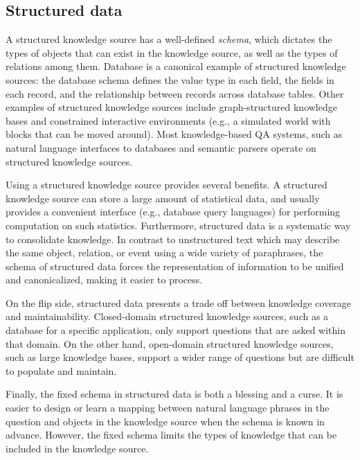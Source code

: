 \subsection{Structured data}

A structured knowledge source
has a well-defined \emph{schema}, which dictates
the types of objects that can exist in the knowledge source,
as well as the types of relations among them.
Database is a canonical example of structured knowledge sources:
the database schema defines the value type in each field,
the fields in each record,
and the relationship between records across database tables.
Other examples of structured knowledge sources
include
graph-structured
knowledge bases \cite{freebase2013dump,suchanek2007yago,auer2007dbpedia}
and constrained interactive environments
(e.g., a simulated world
with blocks that can be moved around).
Most knowledge-based QA systems,
such as natural language interfaces to databases \cite{androutsopoulos95nlidb}
and semantic parsers
\cite{zelle96geoquery,berant2013freebase,chen11navigate}
operate on structured knowledge sources.

Using a structured knowledge source
provides several benefits.
A structured knowledge source can store
a large amount of statistical data,
and usually provides a convenient interface
(e.g., database query languages)
for performing computation on such statistics.
Furthermore, structured data is a systematic way to consolidate knowledge.
In contrast to unstructured text
which may describe the same object,
relation, or event using a wide variety of paraphrases,
the schema of structured data forces the representation of information
to be unified and canonicalized,
making it easier to process.

On the flip side,
structured data presents a trade off between
knowledge coverage and maintainability.
Closed-domain structured knowledge sources,
such as a database for a specific application,
only support questions that are asked within that domain.
On the other hand,
open-domain structured knowledge sources,
such as large knowledge bases,
support a wider range of questions but
are difficult to populate and maintain.

Finally,
the fixed schema in structured data is both a blessing and a curse.
It is easier to design or learn a mapping between
natural language phrases in the question
and objects in the knowledge source
when the schema is known in advance.
However, the fixed schema limits the types
of knowledge that can be included in the knowledge source.

